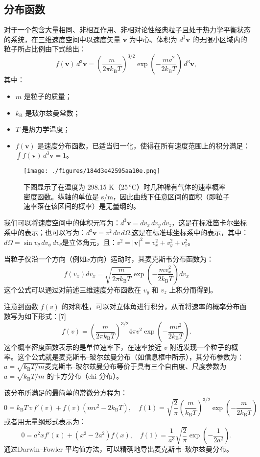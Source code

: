 \subsection{分布函数}
对于一个包含大量相同、非相互作用、非相对论性经典粒子且处于热力学平衡状态的系统，在三维速度空间中以速度矢量 $\mathbf{v}$ 为中心、体积为 $d^3\mathbf{v}$ 的无限小区域内的粒子所占比例由下式给出：
$$
f(\mathbf{v})\, d^3\mathbf{v} = \left( \frac{m}{2\pi k_{\text{B}} T} \right)^{3/2} \exp\left( -\frac{m v^2}{2 k_{\text{B}} T} \right)\, d^3\mathbf{v},~
$$
其中：
\begin{itemize}
\item $m$ 是粒子的质量；
\item $k_{\text{B}}$ 是玻尔兹曼常数；
\item $T$ 是热力学温度；
\item $f(\mathbf{v})$ 是速度分布函数，已适当归一化，使得在所有速度范围上的积分满足：$\int f(\mathbf{v})\, d^3\mathbf{v} = 1$。
\end{itemize}
\begin{figure}[ht]
\centering
\texttt{[image: ./figures/184d3e42595aa10e.png]}
\caption{下图显示了在温度为 298.15 K（25 °C）时几种稀有气体的速率概率密度函数。纵轴的单位是 s/m，因此曲线下任意区间的面积（即粒子速率落在该区间的概率）是无量纲的。} \label{fig_MKBR_1}
\end{figure}
我们可以将速度空间中的体积元写为：$d^3\mathbf{v} = dv_x\, dv_y\, dv_z$，这是在标准笛卡尔坐标系中的表示；也可以写为：$d^3\mathbf{v} = v^2\, dv\, d\Omega$,这是在标准球坐标系中的表示，其中：$d\Omega = \sin{v_{\theta}}\, dv_{\phi}\, dv_{\theta}$是立体角元，且：$v^2 = |\mathbf{v}|^2 = v_x^2 + v_y^2 + v_z^2$。

当粒子仅沿一个方向（例如$x$方向）运动时，其麦克斯韦分布函数为：
$$
f(v_x)dv_x = \sqrt{ \frac{m}{2\pi k_{\text{B}} T} }\exp\left( -\frac{m v_x^2}{2 k_{\text{B}} T} \right)dv_x~
$$
这个公式可以通过对前述三维速度分布函数在 $v_y$ 和 $v_z$ 上积分而得到。

注意到函数 $f(v)$ 的对称性，可以对立体角进行积分，从而将速率的概率分布函数写为如下形式：[7]
$$
f(v) = \left( \frac{m}{2\pi k_{\text{B}} T} \right)^{3/2} 4\pi v^2 \exp\left( -\frac{m v^2}{2 k_{\text{B}} T} \right).~
$$
这个概率密度函数表示的是单位速率下，在速率接近 $v$ 附近发现一个粒子的概率。这个公式就是麦克斯韦–玻尔兹曼分布（如信息框中所示），其分布参数为：$a = \sqrt{k_{\text{B}} T/m}$麦克斯韦–玻尔兹曼分布等价于具有三个自由度、尺度参数为 $a = \sqrt{k_{\text{B}} T / m}$ 的卡方分布（chi 分布）。

该分布所满足的最简单的常微分方程为：
$$
0 = k_{\text{B}} T\, v\, f'(v) + f(v)\left(m v^2 - 2 k_{\text{B}} T\right), \quad
f(1) = \sqrt{\frac{2}{\pi}} \left( \frac{m}{k_{\text{B}} T} \right)^{3/2} \exp\left( -\frac{m}{2 k_{\text{B}} T} \right)~
$$
或者用无量纲形式表示为：
$$
0 = a^2 x f'(x) + \left(x^2 - 2 a^2\right) f(x), \quad
f(1) = \frac{1}{a^3} \sqrt{\frac{2}{\pi}} \exp\left(-\frac{1}{2 a^2} \right).~
$$
通过Darwin–Fowler 平均值方法，可以精确地导出麦克斯韦–玻尔兹曼分布。
